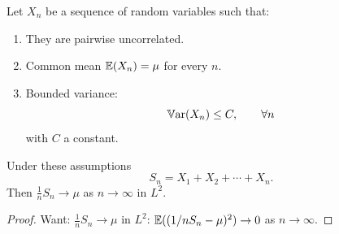 \documentclass[10pt, a4paper]{article}
\begin{document}
\begin{theorem}[WLLN]\footnotemark
    Let $X_n$ be a sequence of random variables such that:
    \begin{enumerate}[label = (\alph*)]
        \item They are pairwise uncorrelated.

        \item Common mean $\mathbb{E}(X_n) = \mu$ for every $n$.

        \item Bounded variance:
        \[
        \mathbb{V}\mathrm{ar}(X_n) \leq C,\qquad \forall n
        \]
        with $C$ a constant.
    \end{enumerate}
    Under these assumptions
    \[
    S_n = X_1 + X_2 + \dotsi + X_n.
    \]
    Then $\frac{1}{n}S_n \to \mu$ as $n \to \infty$ in $L ^ 2$.

    \begin{proof}
        Want:
        $\frac{1}{n}S_n \to \mu$ in $L ^ 2$:
        $\mathbb{E}((1 / nS_n - \mu) ^ 2) \to 0$ as $n \to \infty$.


\end{proof}
\end{theorem}
\end{document}
